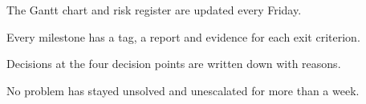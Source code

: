 \begin{donebox}
\begin{checklist}
  \item The Gantt chart and risk register are updated every Friday.
  \item Every milestone has a tag, a report and evidence for each exit criterion.
  \item Decisions at the four decision points are written down with reasons.
  \item No problem has stayed unsolved and unescalated for more than a week.
\end{checklist}
\end{donebox}
